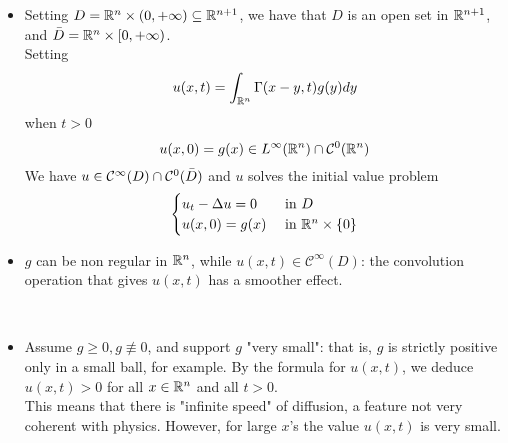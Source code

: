 \begin{remark}
    \begin{itemize}
        \item Setting $D = \mathbb{R}^n \times (0,+\infty) \subseteq \mathbb{R}^{n+1}$, we have that $D$ is an open set in $\mathbb{R}^{n+1}$, and $\Bar{D} = \mathbb{R}^n \times [0,+\infty)$.\\
        Setting 
        \begin{equation*}
            u(x,t) = \int_{\mathbb{R}^n} \Gamma(x-y,t) g(y) dy
        \end{equation*}
        when $t > 0$
        \begin{equation*}
            u(x,0) = g(x) \in L^\infty(\mathbb{R}^n) \cap \mathcal{C}^0(\mathbb{R}^n)
        \end{equation*}
        We have $u \in \mathcal{C}^\infty(D) \cap \mathcal{C}^0(\Bar{D})$ and $u$ solves the initial value problem
        \begin{equation*}
            \begin{cases}
                u_t - \Delta u = 0 & \text{ in } D \\
                u(x,0) = g(x) & \text{ in } \mathbb{R}^n \times \{0\}
            \end{cases}
        \end{equation*}
        \item $g$ can be non regular in $\mathbb{R}^n$, while $u(x,t) \in \mathcal{C}^\infty (D)$: the convolution operation that gives $u(x,t)$ has a smoother effect.\\
        \\
        \item Assume $g \geq 0, g \not\equiv 0$, and support $g$ "very small": that is, $g$ is strictly positive only in a small ball, for example. By the formula for $u(x,t)$, we deduce $u(x,t) > 0$ for all $x \in \mathbb{R}^n$ and all $t> 0$. \\
        This means that there is "infinite speed" of diffusion, a feature not very coherent with physics. However, for large $x$'s the value $u(x,t)$ is very small.
    \end{itemize}
\end{remark}

